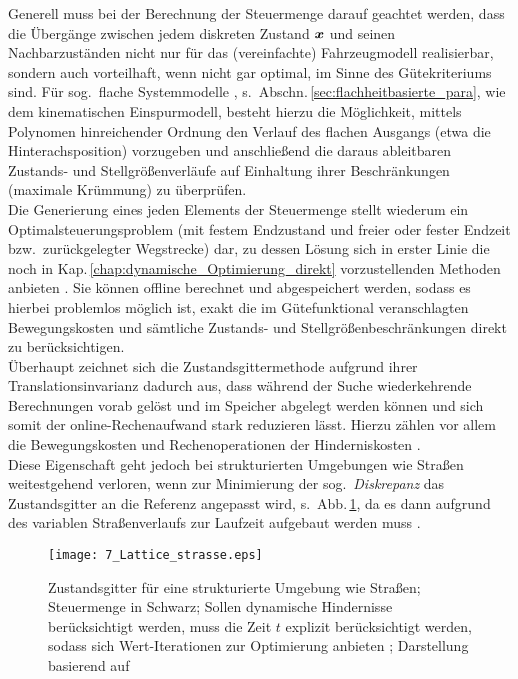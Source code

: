 {Generell muss bei der Berechnung der Steuermenge darauf geachtet werden, dass die Übergänge zwischen jedem diskreten Zustand $\boldsymbol{x}$ und seinen Nachbarzuständen nicht nur für das (vereinfachte) Fahrzeugmodell realisierbar, sondern auch vorteilhaft, wenn nicht gar optimal, im Sinne des Gütekriteriums sind. Für sog.\ flache  Systemmodelle \cite{fliess1995fad}, s.\ Abschn.\,\ref{sec:flachheitbasierte_para}, wie dem kinematischen Einspurmodell, besteht hierzu die Möglichkeit, mittels Polynomen hinreichender Ordnung den Verlauf des flachen Ausgangs (etwa die Hinterachsposition) vorzugeben und anschließend die daraus ableitbaren Zustands- und Stellgrößenverläufe auf Einhaltung ihrer Beschränkungen (\zB maximale Krümmung) zu überprüfen. \\
Die Generierung eines jeden Elements der Steuermenge stellt wiederum ein Optimalsteuerungsproblem (mit festem Endzustand und freier oder fester Endzeit bzw.\ zurückgelegter Wegstrecke) dar, zu dessen Lösung sich in erster Linie die noch in Kap.\,\ref{chap:dynamische_Optimierung_direkt} vorzustellenden Methoden anbieten \cite{howard2007optimal}. Sie können offline berechnet und abgespeichert werden, sodass es hierbei problemlos möglich ist, exakt die im Gütefunktional veranschlagten Bewegungskosten und sämtliche Zustands- und Stellgrößenbeschränkungen direkt zu berücksichtigen. \\
Überhaupt zeichnet sich die Zustandsgittermethode aufgrund ihrer Translationsinvarianz dadurch aus, dass während der Suche wiederkehrende Berechnungen vorab gelöst und im Speicher abgelegt werden können und sich somit der online-Rechenaufwand stark reduzieren lässt. Hierzu zählen vor allem die Bewegungskosten und Rechenoperationen der Hinderniskosten \cite{pivtoraiko2007optimal}. \\
Diese Eigenschaft geht jedoch bei strukturierten Umgebungen wie Straßen weitestgehend verloren, wenn zur Minimierung der sog.\ \emph{Diskrepanz} \cite{lavalle2006pa} das Zustandsgitter an die Referenz angepasst wird, s.\ Abb.\,\ref{fig:lattice_strasse}, da es dann aufgrund des variablen Straßenverlaufs zur Laufzeit aufgebaut werden muss \cite{zieg09spatemp, mcnaughton}.
\begin{figure}[h]
\centering
  	\texttt{[image: 7\_Lattice\_strasse.eps]}
	\caption[Zustandsgitter für eine strukturierte Umgebung]{Zustandsgitter für eine strukturierte Umgebung wie Straßen; Steuermenge in Schwarz; Sollen dynamische Hindernisse berücksichtigt werden, muss die Zeit $t$ explizit berücksichtigt werden, sodass sich Wert-Iterationen zur Optimierung anbieten \cite{zieg09spatemp, mcnaughton}; Darstellung basierend auf \cite{McNaughton2011diss}}
	\label{fig:lattice_strasse}
\end{figure}

}
